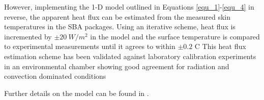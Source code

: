 However, implementing the 1-D model outlined in Equations \ref{equ_1}-\ref{equ_4} in reverse, the apparent heat flux can be estimated from the measured skin temperatures in the SBA packages. Using an iterative scheme, heat flux is incremented by $\pm20\ W/m^2$ in the model and the surface temperature is compared to experimental measurements until it agrees to within $\pm0.2$ \textdegree C This heat flux estimation scheme has been validated against laboratory calibration experiments in an environmental chamber showing good agreement for radiation and convection dominated conditions

Further details on the model can be found in \cite{Residential_Tenability}.




